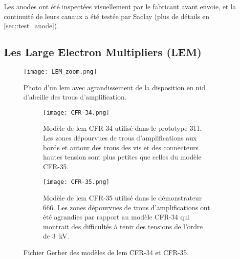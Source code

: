             Les anodes ont été inspectées visuellement par le fabricant avant envoie, et la continuité de leurs canaux a été testée par Saclay (plus de détails en \autoref{sec::test_anode}).
        
        \subsection{Les Large Electron Multipliers (LEM)}\label{sec::LEM}
            
            \begin{figure}[htbp]
                \begin{center}\texttt{[image: LEM\_zoom.png]}\end{center}
                \caption[Photo d'un \gls{lem}.]{Photo d'un \gls{lem} avec agrandissement de la disposition en nid d'abeille des trous d'amplification.}
                \label{fig::LEM}
            \end{figure}
            \begin{figure}[htbp]
                \begin{subfigure}[t]{0.48\textwidth}
                    \texttt{[image: CFR-34.png]}
                    \caption[Modèle de \gls{lem} CFR-34.]{Modèle de \gls{lem} CFR-34 utilisé dans le prototype 311. Les zones dépourvues de trous d'amplifications aux bords et autour des trous des vis et des connecteurs hautes tension sont plus petites que celles du modèle CFR-35.}
                    \label{fig::cfr34}
                \end{subfigure}
                \hfill
                \begin{subfigure}[t]{0.48\textwidth}
                    \texttt{[image: CFR-35.png]}
                    \caption[Modèle de \gls{lem} CFR-35.]{Modèle de \gls{lem} CFR-35 utilisé dans le démonstrateur 666. Les zones dépourvues de trous d'amplifications ont été agrandies par rapport au modèle CFR-34 qui montrait des difficultés à tenir des tensions de l'ordre de \SI{3}{\kilo\volt}.}
                    \label{fig::cfr35}
                \end{subfigure}
                \caption{Fichier Gerber des modèles de \gls{lem} CFR-34 et CFR-35.}
                \label{fig::cfrs}
            \end{figure}
